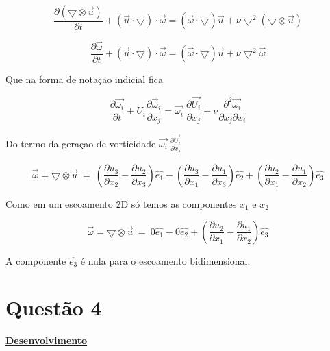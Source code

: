 \documentclass[12pt]{article}
\begin{document}
\begin{equation}
	\frac{\partial (\bigtriangledown \otimes \vec{u})}{\partial t} +  (\vec{u} \cdot \bigtriangledown) \cdot \vec{\omega}   = (\vec{\omega}\cdot \bigtriangledown) \vec{u} + \nu\bigtriangledown^2 \left(  \bigtriangledown \otimes \vec{u} \right) 
\end{equation}

\begin{equation}
	\frac{\partial \vec{\omega}}{\partial t} +  (\vec{u} \cdot \bigtriangledown) \cdot \vec{\omega}   = (\vec{\omega}\cdot \bigtriangledown) \vec{u} + \nu\bigtriangledown^2 \vec{\omega}
\end{equation}

Que na forma de notação indicial fica


\begin{equation}
	\frac{\partial \vec{\omega_i}}{\partial t} +  U_i \frac{\partial \vec{\omega}_i}{\partial x_j}= \vec{\omega_i}\ \frac{\partial \vec{U_i}}{\partial x_j} + \nu \frac{\partial^2 \vec{\omega_i}}{\partial x_j \partial x_i}
\end{equation}

Do termo da geraçao de vorticidade $\vec{\omega_i}\ \frac{\partial \vec{U_i}}{\partial x_j}$

\begin{equation}
	\vec{\omega} = \bigtriangledown \otimes \vec{u} \ = \ \left( \frac{\partial u_3}{\partial x_2} - \frac{\partial u_2}{\partial x_3}\right) \hat{e_1} - \left( \frac{\partial u_3}{\partial x_1} - \frac{\partial u_1}{\partial x_3}\right) \hat{e_2} + \left( \frac{\partial u_2}{\partial x_1} - \frac{\partial u_1}{\partial x_2}\right) \hat{e_3}
\end{equation}

Como em um escoamento 2D só temos as componentes $x_1 $ e $x_2$


\begin{equation}
	\vec{\omega} = \bigtriangledown \otimes \vec{u} \ = \ 0 \hat{e_1} - 0 \hat{e_2} + \left( \frac{\partial u_2}{\partial x_1} - \frac{\partial u_1}{\partial x_2}\right) \hat{e_3}
\end{equation}

A componente $\hat{e_3}$ é nula para o escoamento bidimensional.


\section*{Questão 4}

\textbf{\underline{Desenvolvimento}}
\end{document}
